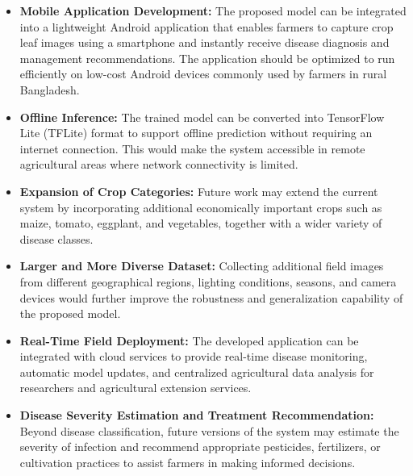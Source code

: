 \begin{itemize}
    \item \textbf{Mobile Application Development:} The proposed model can be integrated into a lightweight Android application that enables farmers to capture crop leaf images using a smartphone and instantly receive disease diagnosis and management recommendations. The application should be optimized to run efficiently on low-cost Android devices commonly used by farmers in rural Bangladesh.

    \item \textbf{Offline Inference:} The trained model can be converted into TensorFlow Lite (TFLite) format to support offline prediction without requiring an internet connection. This would make the system accessible in remote agricultural areas where network connectivity is limited.

    \item \textbf{Expansion of Crop Categories:} Future work may extend the current system by incorporating additional economically important crops such as maize, tomato, eggplant, and vegetables, together with a wider variety of disease classes.

    \item \textbf{Larger and More Diverse Dataset:} Collecting additional field images from different geographical regions, lighting conditions, seasons, and camera devices would further improve the robustness and generalization capability of the proposed model.

    \item \textbf{Real-Time Field Deployment:} The developed application can be integrated with cloud services to provide real-time disease monitoring, automatic model updates, and centralized agricultural data analysis for researchers and agricultural extension services.

    \item \textbf{Disease Severity Estimation and Treatment Recommendation:} Beyond disease classification, future versions of the system may estimate the severity of infection and recommend appropriate pesticides, fertilizers, or cultivation practices to assist farmers in making informed decisions.
\end{itemize}